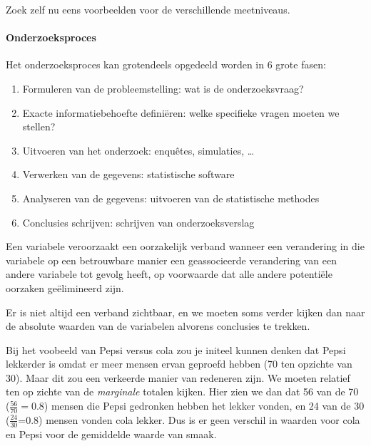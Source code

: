 \begin{exercise}
  Zoek zelf nu eens voorbeelden voor de verschillende meetniveaus.
\end{exercise}

\paragraph{Onderzoeksproces}
Het onderzoeksproces kan grotendeels opgedeeld worden in 6 grote fasen:
\begin{enumerate}
  \item Formuleren van de probleemstelling: wat is de onderzoeksvraag?
  \item Exacte informatiebehoefte defini\"eren: welke specifieke vragen moeten we stellen?
  \item Uitvoeren van het onderzoek: enqu\^etes, simulaties, \dots
  \item Verwerken van de gegevens: statistische software
  \item Analyseren van de gegevens: uitvoeren van de statistische methodes
  \item Conclusies schrijven: schrijven van onderzoeksverslag
\end{enumerate}

\begin{definition}
 Een variabele veroorzaakt een oorzakelijk verband wanneer een verandering in die variabele op een betrouwbare manier een geassocieerde verandering van een andere variabele tot gevolg heeft, op voorwaarde dat alle andere potenti\"ele oorzaken ge\"elimineerd zijn.
\end{definition}

Er is niet altijd een verband zichtbaar, en we moeten soms verder kijken dan naar de absolute waarden van de variabelen alvorens conclusies te trekken.


\begin{example}
  Bij het voobeeld van Pepsi versus cola zou je initeel kunnen denken dat Pepsi lekkerder is omdat er meer mensen ervan geproefd hebben (70 ten opzichte van 30). Maar dit zou een verkeerde manier van redeneren zijn. We moeten relatief ten op zichte van de  \textit{marginale} totalen kijken. Hier zien we dan dat 56 van de 70 ($\frac{56}{70} = 0.8$) mensen die Pepsi gedronken hebben het lekker vonden, en 24 van de 30 ($\frac{24}{30}$=0.8) mensen vonden cola lekker. Dus is er geen verschil in waarden voor cola en Pepsi voor de gemiddelde waarde van smaak.
\end{example}

